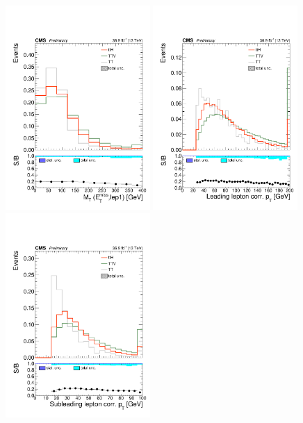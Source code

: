 \begin{figure}[htp]
\centering
\includegraphics[width=0.49\textwidth]{ch9_figs/kinMVA_input_MT_met_lep1.pdf}
\includegraphics[width=0.49\textwidth]{ch9_figs/kinMVA_input_LepGood0_conePt.pdf}\\
\includegraphics[width=0.49\textwidth]{ch9_figs/kinMVA_input_LepGood1_conePt.pdf}

\end{figure}
